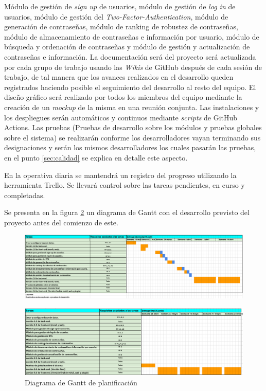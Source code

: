\documentclass{article}
\begin{document}
Módulo de gestión de \textit{sign up} de usuarios, módulo de gestión de \textit{log in} de usuarios, módulo de gestión del \textit{Two-Factor-Authentication}, módulo de generación de contraseñas, módulo de ranking de robustez de contraseñas, módulo de almacenamiento de contraseñas e información por usuario, módulo de búsqueda y ordenación de contraseñas y módulo de gestión y actualización de contraseñas e información. La documentación será del proyecto será actualizada por cada grupo de trabajo usando las \textit{Wikis} de GitHub después de cada sesión de trabajo, de tal manera que los avances realizados en el desarrollo queden registrados haciendo posible el seguimiento del desarrollo al resto del equipo. El diseño gráfico será realizado por todos los miembros del equipo mediante la creación de un \textit{mockup} de la misma en una reunión conjunta. Las instalaciones y los despliegues serán automáticos y continuos mediante \textit{scripts} de GitHub Actions. Las pruebas (Pruebas de desarrollo sobre los módulos y pruebas globales sobre el sistema) se realizarán conforme los desarrolladores vayan terminando sus designaciones y serán los mismos desarrolladores los cuales pasarán las pruebas, en el punto \ref{sec:calidad} se explica en detalle este aspecto.
 
En la operativa diaria se mantendrá un registro del progreso utilizando la herramienta Trello. Se llevará control sobre las tareas pendientes, en curso y completadas.
 
Se presenta en la figura \ref{gantt-2} un diagrama de Gantt con el desarrollo previsto del proyecto antes del comienzo de este.

\pagebreak

\begin{landscape}
   \begin{figure}[H]
       \centering
       \includegraphics[width=1.4\textheight]{../images/diag-gantt-1.png}
       \label{gantt-1}
   \end{figure}
  
   \begin{figure}[H]
       \centering
       \includegraphics[width=1.4\textheight]{../images/diag-gantt-2.png}
       \caption{Diagrama de Gantt de planificación}
       \label{gantt-2}
   \end{figure}
\end{landscape}
\end{document}
